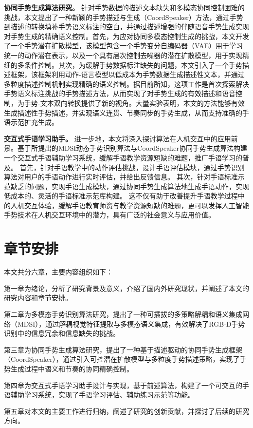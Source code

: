 \textbf{协同手势生成算法研究。} 
针对手势数据的描述文本缺失和多模态协同控制困难的挑战，本文提出了一种新颖的手势描述与生成（CoordSpeaker）方法，通过手势到描述的转换填补手势语义标注的空白，并通过描述增强的伴随语音手势生成实现对手势生成的精确语义控制。首先，为应对协同多模态控制生成的挑战，本文开发了一个手势潜在扩散模型，该模型包含一个手势变分自编码器（VAE）用于学习统一的动作潜在表示，以及一个具有层次控制去噪器的潜在扩散模型，用于实现精细的多条件控制。其次，为缓解手势数据标注缺失的问题，本文引入了一个手势描述框架，该框架利用动作-语言模型以低成本为手势数据生成描述性文本，并通过多粒度描述控制机制实现精确的语义控制。据目前所知，这项工作是首次探索解决手势语义标注挑战的手势描述方法，从而实现了对手势生成的有效描述和语音控制，为手势-文本双向转换提供了新的视角。大量实验表明，本文的方法能够有效生成描述性手势描述，并实现语义连贯、节奏同步的手势生成，从而支持准确的手语示范扩充生成。

\textbf{交互式手语学习助手。}
进一步地，本文将深入探讨算法在人机交互中的应用前景。基于所提出的MDSI动态手势识别算法与CoordSpeaker协同手势生成算法构建一个交互式手语辅助学习系统，缓解手语教学资源短缺的难题，推广手语学习的普及。
首先，针对手语教学中的动作评估挑战，设计手语评估模块，通过手势识别算法对用户的手语动作进行实时评估，并给出反馈信息。
其次，针对手语标准示范缺乏的问题，实现手语生成模块，通过协同手势生成算法地生成手语动作，实现低成本的、灵活的手语标准示范库构建。
这不仅有助于改善提升手语教学过程中的人机交互体验，缓解手语教育师资与教学资源短缺的难题\cite{2022signlearning}，更可以发挥人工智能手势技术在人机交互环境中的潜力，具有广泛的社会意义与应用价值。



\section{章节安排}

本文共分六章，主要内容组织如下：

第一章为绪论，分析了研究背景及意义，介绍了国内外研究现状，并阐述了本文的研究内容和章节安排。


第二章为多模态手势识别算法研究，提出了一种可插拔的多策略解耦和语义集成网络（MDSI），通过解耦视觉特征提取与多模态语义集成，有效解决了RGB-D手势识别中的信息冗余和信息缺失的挑战。

第三章为协同手势生成算法研究，提出了一种基于描述驱动的协同手势生成框架（CoordSpeaker），通过引入可控潜在扩散模型与多粒度手势描述策略，实现了手势生成过程中语义和节奏的协同精确控制。

第四章为交互式手语学习助手设计与实现，基于前述算法，构建了一个可交互的手语辅助学习系统，实现了手语学习评估、辅助练习示范等功能。

第五章对本文的主要工作进行归纳，阐述了研究的创新贡献，并探讨了后续的研究方向。
